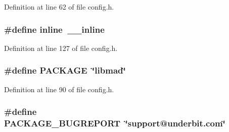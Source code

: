 Definition at line 62 of file config.\+h.

\subsubsection[{\texorpdfstring{inline}{inline}}]{\setlength{\rightskip}{0pt plus 5cm}\#define inline~{\bf \+\_\+\+\_\+inline}}\hypertarget{lib-src_2libmad_2msvc_09_09_2config_8h_a00d24c7231be28dbaf71f5408f30e44c}{}\label{lib-src_2libmad_2msvc_09_09_2config_8h_a00d24c7231be28dbaf71f5408f30e44c}


Definition at line 127 of file config.\+h.

\subsubsection[{\texorpdfstring{P\+A\+C\+K\+A\+GE}{PACKAGE}}]{\setlength{\rightskip}{0pt plus 5cm}\#define P\+A\+C\+K\+A\+GE~\char`\"{}libmad\char`\"{}}\hypertarget{lib-src_2libmad_2msvc_09_09_2config_8h_aca8570fb706c81df371b7f9bc454ae03}{}\label{lib-src_2libmad_2msvc_09_09_2config_8h_aca8570fb706c81df371b7f9bc454ae03}


Definition at line 90 of file config.\+h.

\subsubsection[{\texorpdfstring{P\+A\+C\+K\+A\+G\+E\+\_\+\+B\+U\+G\+R\+E\+P\+O\+RT}{PACKAGE_BUGREPORT}}]{\setlength{\rightskip}{0pt plus 5cm}\#define P\+A\+C\+K\+A\+G\+E\+\_\+\+B\+U\+G\+R\+E\+P\+O\+RT~\char`\"{}support@underbit.\+com\char`\"{}}\hypertarget{lib-src_2libmad_2msvc_09_09_2config_8h_a1d1d2d7f8d2f95b376954d649ab03233}{}\label{lib-src_2libmad_2msvc_09_09_2config_8h_a1d1d2d7f8d2f95b376954d649ab03233}



